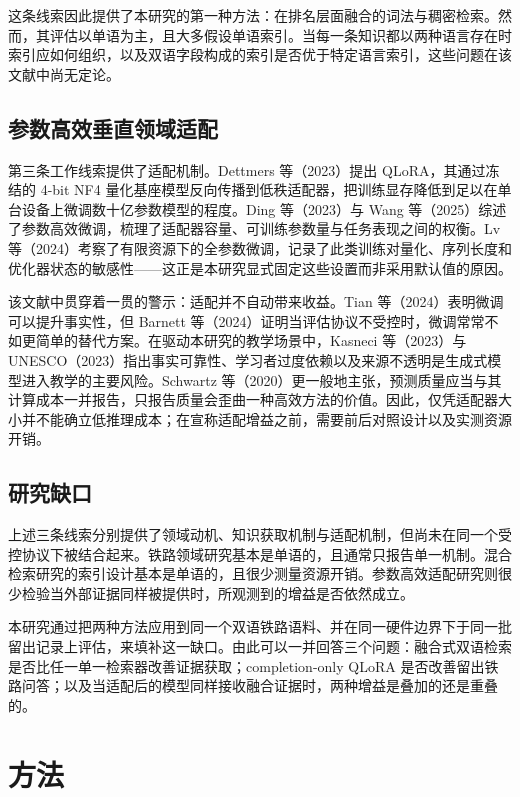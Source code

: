 \documentclass{article}
\begin{document}
这条线索因此提供了本研究的第一种方法：在排名层面融合的词法与稠密检索。然而，其评估以单语为主，且大多假设单语索引。当每一条知识都以两种语言存在时索引应如何组织，以及双语字段构成的索引是否优于特定语言索引，这些问题在该文献中尚无定论。

\subsection{参数高效垂直领域适配}

第三条工作线索提供了适配机制。Dettmers 等（2023）提出 QLoRA，其通过冻结的 4-bit NF4 量化基座模型反向传播到低秩适配器，把训练显存降低到足以在单台设备上微调数十亿参数模型的程度。Ding 等（2023）与 Wang 等（2025）综述了参数高效微调，梳理了适配器容量、可训练参数量与任务表现之间的权衡。Lv 等（2024）考察了有限资源下的全参数微调，记录了此类训练对量化、序列长度和优化器状态的敏感性——这正是本研究显式固定这些设置而非采用默认值的原因。

该文献中贯穿着一贯的警示：适配并不自动带来收益。Tian 等（2024）表明微调可以提升事实性，但 Barnett 等（2024）证明当评估协议不受控时，微调常常不如更简单的替代方案。在驱动本研究的教学场景中，Kasneci 等（2023）与 UNESCO（2023）指出事实可靠性、学习者过度依赖以及来源不透明是生成式模型进入教学的主要风险。Schwartz 等（2020）更一般地主张，预测质量应当与其计算成本一并报告，只报告质量会歪曲一种高效方法的价值。因此，仅凭适配器大小并不能确立低推理成本；在宣称适配增益之前，需要前后对照设计以及实测资源开销。

\subsection{研究缺口}

上述三条线索分别提供了领域动机、知识获取机制与适配机制，但尚未在同一个受控协议下被结合起来。铁路领域研究基本是单语的，且通常只报告单一机制。混合检索研究的索引设计基本是单语的，且很少测量资源开销。参数高效适配研究则很少检验当外部证据同样被提供时，所观测到的增益是否依然成立。

本研究通过把两种方法应用到同一个双语铁路语料、并在同一硬件边界下于同一批留出记录上评估，来填补这一缺口。由此可以一并回答三个问题：融合式双语检索是否比任一单一检索器改善证据获取；completion-only QLoRA 是否改善留出铁路问答；以及当适配后的模型同样接收融合证据时，两种增益是叠加的还是重叠的。

\section{方法}
\end{document}
